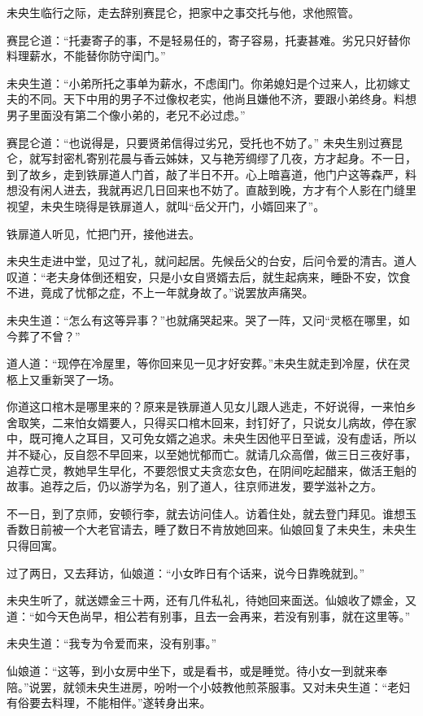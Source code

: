 \documentclass[a4paper,12pt,UTF8,twoside]{ctexbook}
\begin{document}
未央生临行之际，走去辞别赛昆仑，把家中之事交托与他，求他照管。

赛昆仑道：“托妻寄子的事，不是轻易任的，寄子容易，托妻甚难。劣兄只好替你料理薪水，不能替你防守闺门。”

未央生道：“小弟所托之事单为薪水，不虑闺门。你弟媳妇是个过来人，比初嫁丈夫的不同。天下中用的男子不过像权老实，他尚且嫌他不济，要跟小弟终身。料想男子里面没有第二个像小弟的，老兄不必过虑。”

赛昆仑道：“也说得是，只要贤弟信得过劣兄，受托也不妨了。” 未央生别过赛昆仑，就写封密札寄别花晨与香云姊妹，又与艳芳绸缪了几夜，方才起身。不一日，到了故乡，走到铁扉道人门首，敲了半日不开。心上暗喜道，他门户这等森严，料想没有闲人进去，我就再迟几日回来也不妨了。直敲到晚，方才有个人影在门缝里视望，未央生晓得是铁扉道人，就叫“岳父开门，小婿回来了”。

铁扉道人听见，忙把门开，接他进去。

未央生走进中堂，见过了礼，就问起居。先候岳父的台安，后问令爱的清吉。道人叹道：“老夫身体倒还粗安，只是小女自贤婿去后，就生起病来，睡卧不安，饮食不进，竟成了忧郁之症，不上一年就身故了。”说罢放声痛哭。

未央生道：“怎么有这等异事？”也就痛哭起来。哭了一阵，又问“灵柩在哪里，如今葬了不曾？”

道人道：“现停在冷屋里，等你回来见一见才好安葬。”未央生就走到冷屋，伏在灵柩上又重新哭了一场。

你道这口棺木是哪里来的？原来是铁扉道人见女儿跟人逃走，不好说得，一来怕乡舍取笑，二来怕女婿要人，只得买口棺木回来，封钉好了，只说女儿病故，停在家中，既可掩人之耳目，又可免女婿之追求。未央生因他平日至诚，没有虚话，所以并不疑心，反自怨不早回来，以至她忧郁而亡。就请几众高僧，做三日三夜好事，追荐亡灵，教她早生早化，不要怨恨丈夫贪恋女色，在阴间吃起醋来，做活王魁的故事。追荐之后，仍以游学为名，别了道人，往京师进发，要学滋补之方。

不一日，到了京师，安顿行李，就去访问佳人。访着住处，就去登门拜见。谁想玉香数日前被一个大老官请去，睡了数日不肯放她回来。仙娘回复了未央生，未央生只得回寓。

过了两日，又去拜访，仙娘道：“小女昨日有个话来，说今日靠晚就到。”

未央生听了，就送嫖金三十两，还有几件私礼，待她回来面送。仙娘收了嫖金，又道：“如今天色尚早，相公若有别事，且去一会再来，若没有别事，就在这里等。”

未央生道：“我专为令爱而来，没有别事。”

仙娘道：“这等，到小女房中坐下，或是看书，或是睡觉。待小女一到就来奉陪。”说罢，就领未央生进房，吩咐一个小妓教他煎茶服事。又对未央生道：“老妇有俗要去料理，不能相伴。”遂转身出来。
\end{document}
